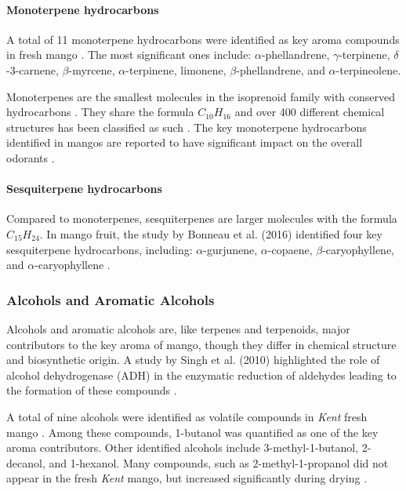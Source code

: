 \paragraph*{Monoterpene hydrocarbons}
A total of 11 monoterpene hydrocarbons were identified as key aroma compounds in fresh mango \cite*{A07_Bonneau2016}. The most significant ones include: $\alpha$-phellandrene, $\gamma$-terpinene, $\delta$-3-carnene, $\beta$-myrcene, $\alpha$-terpinene, limonene, $\beta$-phellandrene, and $\alpha$-terpineolene. 

\vspace{1em}
Monoterpenes are the smallest molecules in the isoprenoid family with conserved hydrocarbons \cite*{A09_Barras2024}. They share the formula $C_{10}H_{16}$ and over 400 different chemical structures has been classified as such \cite*{A09_Barras2024}. The key monoterpene hydrocarbons identified in mangos are reported to have significant impact on the overall odorants \cite*{A07_Bonneau2016}.

\paragraph*{Sesquiterpene hydrocarbons}
Compared to monoterpenes, sesquiterpenes are larger molecules with the formula $C_{15}H_{24}$. In mango fruit, the study by Bonneau et al. (2016) identified four key sesquiterpene hydrocarbons, including: $\alpha$-gurjunene, $\alpha$-copaene, $\beta$-caryophyllene, and $\alpha$-caryophyllene \cite*{A07_Bonneau2016}.


\subsubsection{Alcohols and Aromatic Alcohols}
Alcohols and aromatic alcohols are, like terpenes and terpenoids, major contributors to the key aroma of mango, though they differ in chemical structure and biosynthetic origin. A study by Singh et al. (2010) highlighted the role of alcohol dehydrogenase (ADH) in the enzymatic reduction of aldehydes leading to the formation of these compounds \cite*{A10_Singh2010}.

\vspace{1em}
A total of nine alcohols were identified as volatile compounds in \textit{Kent} fresh mango \cite*{A07_Bonneau2016}. Among these compounds, 1-butanol was quantified as one of the key aroma contributors. Other identified alcohols include 3-methyl-1-butanol, 2-decanol, and 1-hexanol. Many compounds, such as 2-methyl-1-propanol did not appear in the fresh \textit{Kent} mango, but increased significantly during drying \cite*{A07_Bonneau2016}.

